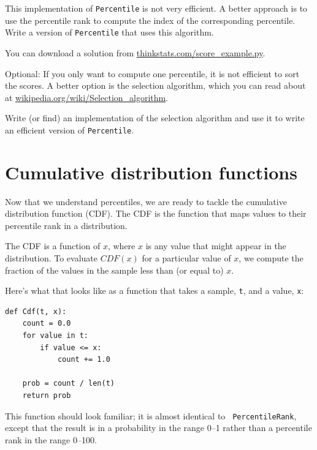 \documentclass[12pt]{book}
\begin{document}
\begin{exercise}
This implementation of {\tt Percentile} is not very efficient.  A
better approach is to use the percentile rank to compute the index of
the corresponding percentile.  Write a version of {\tt Percentile} that
uses this algorithm.

You can download a solution from \url{thinkstats.com/score_example.py}.


\end{exercise}

\begin{exercise}
Optional: If you only want to compute one percentile, it is not
efficient to sort the scores.  A better option is the selection
algorithm, which you can read about at
\url{wikipedia.org/wiki/Selection_algorithm}.


Write (or find) an implementation of the selection algorithm and use
it to write an efficient version of {\tt Percentile}.

\end{exercise}


\section{Cumulative distribution functions}


Now that we understand percentiles, we are ready to tackle the
cumulative distribution function (CDF).  The CDF is the function that
maps values to their percentile rank in a distribution.

The CDF is a function of $x$, where $x$ is any value that might appear
in the distribution.  To evaluate $CDF(x)$ for a particular value of
$x$, we compute the fraction of the values in the sample less than (or
equal to) $x$.

Here's what that looks like as a function that takes a sample,
{\tt t}, and a value, {\tt x}:

\begin{verbatim}
def Cdf(t, x):
    count = 0.0
    for value in t:
        if value <= x:
            count += 1.0

    prob = count / len(t)
    return prob
\end{verbatim}

This function should look familiar; it is almost identical to {\tt
  PercentileRank}, except that the result is in a probability in the
range 0--1 rather than a percentile rank in the range 0--100.
\end{document}
